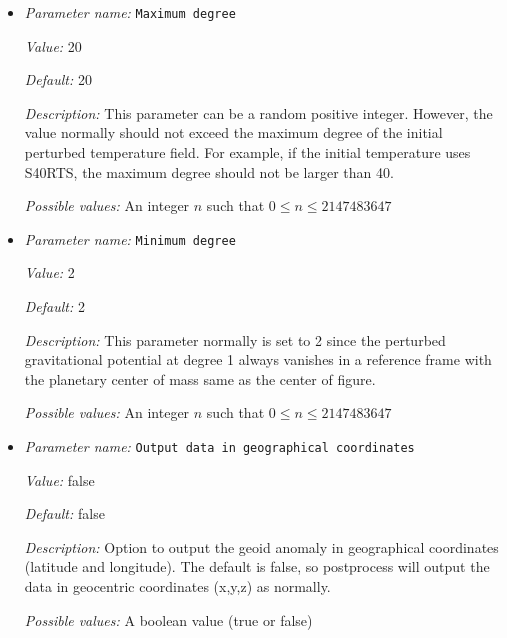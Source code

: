 \begin{itemize}
{\it Value:} 9900


{\it Default:} 9900


{\it Description:} The density value below the CMB boundary.


{\it Possible values:} A floating point number $v$ such that $0 \leq v \leq \text{MAX\_DOUBLE}$
\item {\it Parameter name:} {\tt Maximum degree}
\label{parameters:Postprocess/Geoid/Maximum degree}


{\it Value:} 20


{\it Default:} 20


{\it Description:} This parameter can be a random positive integer. However, the value normally should not exceed the maximum degree of the initial perturbed temperature field. For example, if the initial temperature uses S40RTS, the maximum degree should not be larger than 40.


{\it Possible values:} An integer $n$ such that $0\leq n \leq 2147483647$
\item {\it Parameter name:} {\tt Minimum degree}
\label{parameters:Postprocess/Geoid/Minimum degree}


{\it Value:} 2


{\it Default:} 2


{\it Description:} This parameter normally is set to 2 since the perturbed gravitational potential at degree 1 always vanishes in a reference frame with the planetary center of mass same as the center of figure.


{\it Possible values:} An integer $n$ such that $0\leq n \leq 2147483647$
\item {\it Parameter name:} {\tt Output data in geographical coordinates}
\label{parameters:Postprocess/Geoid/Output data in geographical coordinates}


{\it Value:} false


{\it Default:} false


{\it Description:} Option to output the geoid anomaly in geographical coordinates (latitude and longitude). The default is false, so postprocess will output the data in geocentric coordinates (x,y,z) as normally.


{\it Possible values:} A boolean value (true or false)
\end{itemize}

